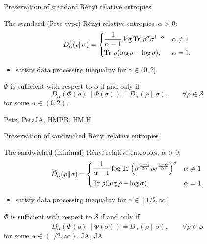 \documentclass[mathserif]{beamer}
\newcommand{\<}{\langle}
\renewcommand{\>}{\rangle}
\newcommand{\supp}{\operatorname{supp}}
\newcommand{\Tr}{\operatorname{Tr}\,}
\newcommand{\Se}{\mathcal S}
\begin{document}
\begin{frame}{Preservation of standard R\'enyi relative entropies}

The standard (Petz-type) R\'enyi relative entropies, $\alpha>0$:
\[
D_\alpha(\rho\|\sigma)=\begin{dcases} \frac{1}{\alpha-1}\log \Tr\rho^\alpha\sigma^{1-\alpha}&
\alpha\ne 1\\
\Tr\rho(\log \rho-\log\sigma), & \alpha=1.
\end{dcases}
\]

\begin{itemize}
\item satisfy data processing inequality for $\alpha\in (0,2]$.

\end{itemize}

\bigskip 
$\Phi$ is sufficient with respect to $\Se$  if and only if
\[
D_\alpha(\Phi(\rho)\|\Phi(\sigma))=D_\alpha(\rho\|\sigma),\qquad \forall \rho\in \Se
\]
for some $\alpha\in (0,2)$. 


Petz, PetzJA, HMPB, HM,H
\end{frame}



\begin{frame}{Preservation of sandwiched R\'enyi relative entropies}


The sandwiched (minimal) R\'enyi relative entropies, $\alpha>0$:
\[
\tilde D_\alpha(\rho\|\sigma)=\begin{dcases} \frac{1}{\alpha-1}\log \Tr\left(\sigma^{\frac{1-\alpha}{2\alpha}}\rho\sigma^{\frac{1-\alpha}{2\alpha}}\right)^\alpha    &
\alpha\ne 1\\[0.2em]
\Tr\rho(\log \rho-\log\sigma), & \alpha=1.
\end{dcases}
\]


\begin{itemize}
\item satisfy data processing inequality for $\alpha\in [1/2,\infty]$

\end{itemize}
\bigskip

$\Phi$ is sufficient with respect to $\Se$  if and only if
\[
\tilde D_\alpha(\Phi(\rho)\|\Phi(\sigma))=\tilde D_\alpha(\rho\|\sigma),\qquad \forall \rho\in \Se
\]
for some $\alpha\in (1/2,\infty)$.
JA, JA
%


\end{frame}
\end{document}
